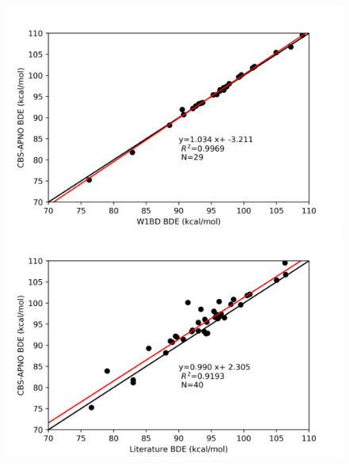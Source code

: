 \begin{figure}
\centering
\begin{minipage}{8cm}
  \centering
  \includegraphics[width=\textwidth]{figures/w1bd-cbsapno}
\end{minipage}%
\begin{minipage}{8cm}
  \centering
  \includegraphics[width=\textwidth]{figures/lit-cbsapno}
\end{minipage}
\end{figure}

